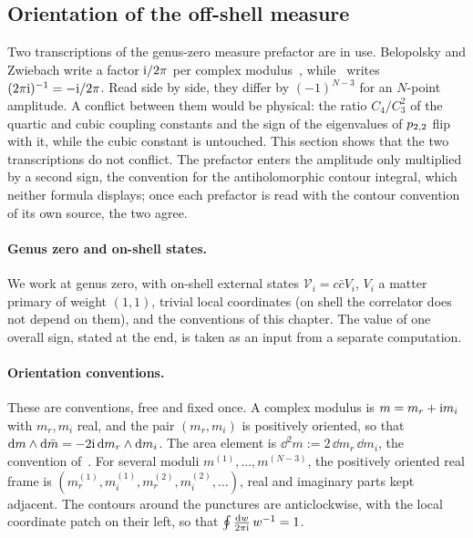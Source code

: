 \subsection{Orientation of the off-shell measure}
\label{sec:conv:measure}


Two transcriptions of the genus-zero measure prefactor are in use.
Belopolsky and Zwiebach write a factor $\mathrm{i} / 2\pi$ per complex modulus~\cite{Belopolsky:1995:OffshellClosedString}, while~\cite{Erbin:2021:StringFieldTheory} writes $(2\pi \mathrm{i})^{-1} = - \mathrm{i} / 2\pi$.
Read side by side, they differ by $(-1)^{N-3}$ for an $N$-point amplitude.
A conflict between them would be physical: the ratio $C_4 / C_3^2$ of the quartic and cubic coupling constants and the sign of the eigenvalues of $p_{2,2}$ flip with it, while the cubic constant is untouched.
This section shows that the two transcriptions do not conflict.
The prefactor enters the amplitude only multiplied by a second sign, the convention for the antiholomorphic contour integral, which neither formula displays; once each prefactor is read with the contour convention of its own source, the two agree.

\paragraph{Genus zero and on-shell states.}
We work at genus zero, with on-shell external states $\mathscr V_i = c \bar c V_i$, $V_i$ a matter primary of weight $(1, 1)$, trivial local coordinates (on shell the correlator does not depend on them), and the conventions of this chapter.
The value of one overall sign, stated at the end, is taken as an input from a separate computation.

\paragraph{Orientation conventions.}
These are conventions, free and fixed once.
A complex modulus is $m = m_r + \mathrm{i} m_i$ with $m_r, m_i$ real, and the pair $(m_r, m_i)$ is positively oriented, so that $\mathrm{d} m \wedge \mathrm{d} \bar m = - 2 \mathrm{i} \, \mathrm{d} m_r \wedge \mathrm{d} m_i$.
The area element is $\dd^2 m := 2 \, \dd m_r \, \dd m_i$, the convention of~\cite{Erbin:2021:StringFieldTheory}.
For several moduli $m^{(1)}, \ldots, m^{(N-3)}$, the positively oriented real frame is $(m^{(1)}_r, m^{(1)}_i, m^{(2)}_r, m^{(2)}_i, \ldots)$, real and imaginary parts kept adjacent.
The contours around the punctures are anticlockwise, with the local coordinate patch on their left, so that $\oint \frac{\mathrm{d} w}{2\pi \mathrm{i}} \, w^{-1} = 1$.

